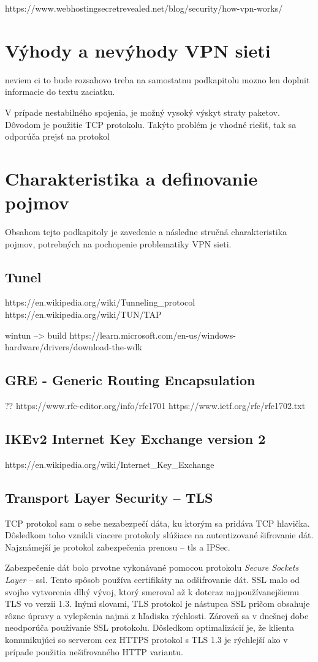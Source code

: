 https://www.webhostingsecretrevealed.net/blog/security/how-vpn-works/

\section{Výhody a nevýhody VPN sieti}
neviem ci to bude rozsahovo treba na samostatnu podkapitolu
mozno len doplnit informacie do textu zaciatku.

V prípade nestabilného spojenia, je možný vysoký výskyt straty paketov. Dôvodom je použitie TCP protokolu. Takýto problém je vhodné riešiť, tak sa odporúča prejsť na protokol 

\section{Charakteristika a definovanie pojmov}
Obsahom tejto podkapitoly je zavedenie a následne stručná charakteristika pojmov, potrebných na pochopenie problematiky VPN sieti.
\subsection{Tunel}
https://en.wikipedia.org/wiki/Tunneling\_protocol
https://en.wikipedia.org/wiki/TUN/TAP

wintun --> build https://learn.microsoft.com/en-us/windows-hardware/drivers/download-the-wdk
\subsection{GRE - Generic Routing Encapsulation}\label{gre}
??
https://www.rfc-editor.org/info/rfc1701
https://www.ietf.org/rfc/rfc1702.txt

\subsection{IKEv2 Internet Key Exchange version 2}
https://en.wikipedia.org/wiki/Internet\_Key\_Exchange

\subsection{Transport Layer Security -- TLS}
TCP protokol sam o sebe nezabezpečí dáta, ku ktorým sa pridáva TCP hlavička. Dôsledkom toho vznikli viacere protokoly slúžiace na autentizované šifrovanie dát. Najznámejší je protokol zabezpečenia prenosu -- \acrshort{tls} a IPSec.

Zabezpečenie dát bolo prvotne vykonávané pomocou protokolu \textit{Secure Sockets Layer} -- \acrshort{ssl}. Tento spôsob používa certifikáty na odšifrovanie dát. SSL malo od svojho vytvorenia dlhý vývoj, ktorý smeroval až k doteraz najpoužívanejšiemu TLS vo verzii 1.3. Inými slovami, TLS protokol je nástupca SSL pričom obsahuje rôzne úpravy a vylepšenia najmä z hľadiska rýchlosti. Zároveň sa v dnešnej dobe neodporúča používanie SSL protokolu. Dôsledkom optimalizácií je, že klienta komunikujúci so serverom cez HTTPS protokol s TLS 1.3 je rýchlejší ako v prípade použitia nešifrovaného HTTP variantu. 

